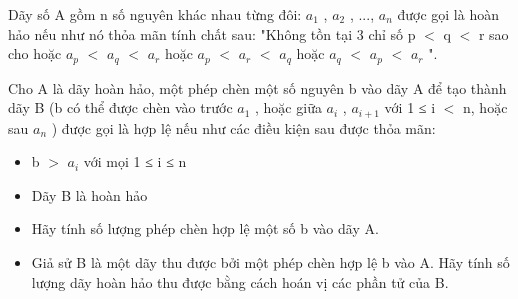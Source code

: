 Dãy số A gồm n số nguyên khác nhau từng đôi: $a_{1}$   , $a_{2}$   , ..., $a_{n}$   được gọi là hoàn hảo nếu như nó thỏa mãn tính chất sau: "Không tồn tại 3 chỉ số p $<$ q $<$ r sao cho hoặc $a_{p}$   $<$ $a_{q}$   $<$ $a_{r}$   hoặc $a_{p}$   $<$ $a_{r}$   $<$ $a_{q}$   hoặc $a_{q}$   $<$ $a_{p}$   $<$ $a_{r}$   ".  

   Cho A là dãy hoàn hảo, một phép chèn một số nguyên b vào dãy A để tạo thành dãy B (b có thể được chèn vào trước $a_{1}$   , hoặc giữa $a_{i}$   , $a_{i+1}$   với 1 ≤ i $<$ n, hoặc sau $a_{n}$   ) được gọi là hợp lệ nếu như các điều kiện sau được thỏa mãn:  
\begin{itemize}
	\item     b $>$ $a_{i}$    với mọi 1 ≤ i ≤ n   
	\item     Dãy B là hoàn hảo   
\end{itemize}
\begin{itemize}
\end{itemize}
\begin{itemize}
	\item     Hãy tính số lượng phép chèn hợp lệ một số b vào dãy A.   
	\item     Giả sử B là một dãy thu được bởi một phép chèn hợp lệ b vào A. Hãy tính số lượng dãy hoàn hảo thu được bằng cách hoán vị các phần tử của B.   
\end{itemize}